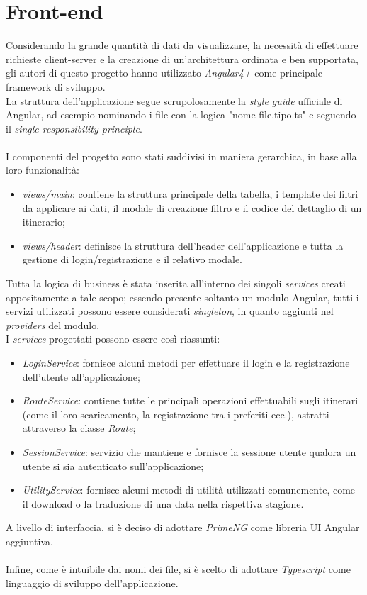 \documentclass[11pt]{report}
\begin{document}
\section{Front-end}
Considerando la grande quantità di dati da visualizzare, la necessità di effettuare richieste client-server e la creazione di un'architettura ordinata e ben supportata, gli autori di questo progetto hanno utilizzato \textit{Angular4+} come principale framework di sviluppo.
\\La struttura dell'applicazione segue scrupolosamente la \textit{style guide} ufficiale di Angular, ad esempio nominando i file con la logica "nome-file.tipo.ts" e seguendo il \textit{single responsibility principle}.
\\\\I componenti del progetto sono stati suddivisi in maniera gerarchica, in base alla loro funzionalità:
\begin{itemize}
	\item \textit{views/main}: contiene la struttura principale della tabella, i template dei filtri da applicare ai dati, il modale di creazione filtro e il codice del dettaglio di un itinerario;
	\item \textit{views/header}: definisce la struttura dell'header dell'applicazione e tutta la gestione di login/registrazione e il relativo modale.
\end{itemize}
Tutta la logica di business è stata inserita all'interno dei singoli \textit{services} creati appositamente a tale scopo; essendo presente soltanto un modulo Angular, tutti i servizi utilizzati possono essere considerati \textit{singleton}, in quanto aggiunti nel \textit{providers} del modulo.
\\I \textit{services} progettati possono essere così riassunti:
\begin{itemize}
	\item \textit{LoginService}: fornisce alcuni metodi per effettuare il login e la registrazione dell'utente all'applicazione;
	\item \textit{RouteService}: contiene tutte le principali operazioni effettuabili sugli itinerari (come il loro scaricamento, la registrazione tra i preferiti ecc.), astratti attraverso la classe \textit{Route};
	\item \textit{SessionService}: servizio che mantiene e fornisce la sessione utente qualora un utente si sia autenticato sull'applicazione;
	\item \textit{UtilityService}: fornisce alcuni metodi di utilità utilizzati comunemente, come il download o la traduzione di una data nella rispettiva stagione.
\end{itemize}
A livello di interfaccia, si è deciso di adottare \textit{PrimeNG} come libreria UI Angular aggiuntiva.
\\\\Infine, come è intuibile dai nomi dei file, si è scelto di adottare \textit{Typescript} come linguaggio di sviluppo dell'applicazione.
\pagebreak
\end{document}
